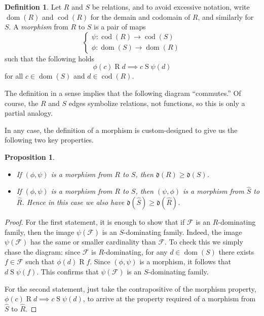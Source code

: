 \documentclass[11pt,oneside]{amsbook}
\DeclareMathOperator{\dom}{dom}
\DeclareMathOperator{\cod}{cod}
\theoremstyle{definition}
\theoremstyle{plain}
\newtheorem{prop}[thm]{Proposition}
\theoremstyle{definition}
\newtheorem{defn}[thm]{Definition}
\theoremstyle{remark}
\begin{document}
\begin{defn}
  Let $R$ and $S$ be relations, and to avoid excessive notation, write $\dom(R)$ and $\cod(R)$ for the demain and codomain of $R$, and similarly for $S$. A \emph{morphism} from $R$ to $S$ is a pair of maps
\[\begin{cases}\psi\colon\cod(R)\to\cod(S)\\\phi\colon\dom(S)\to\dom(R)\end{cases}
\]
such that the following holds
\[\phi(c)\mathrel{R}d\implies c\mathrel{S}\psi(d)
\]
for all $c\in\dom(S)$ and $d\in\cod(R)$.
\end{defn}

The definition in a sense implies that the following diagram ``commutes.'' Of course, the $R$ and $S$ edges symbolize relations, not functions, so this is only a partial analogy.
\begin{center}
\end{center}
In any case, the definition of a morphism is custom-designed to give us the following two key properties.

\begin{prop}
  \label{prop:morphism}
  \begin{itemize}
  \item If $(\phi,\psi)$ is a morphism from $R$ to $S$, then $\mathfrak d(R)\geq\mathfrak d(S)$.
  \item If $(\phi,\psi)$ is a morphism from $R$ to $S$, then $(\psi,\phi)$ is a morphism from $\hat S$ to $\hat R$. Hence in this case we also have $\mathfrak d(\hat S)\geq\mathfrak d(\hat R)$.
  \end{itemize}
\end{prop}

\begin{proof}
  For the first statement, it is enough to show that if $\mathcal F$ is an $R$-dominating family, then the image $\psi(\mathcal F)$ is an $S$-dominating family. Indeed, the image $\psi(\mathcal F)$ has the same or smaller cardinality than $\mathcal F$. To check this we simply chase the diagram: since $\mathcal F$ is $R$-dominating, for any $d\in\dom(S)$ there exists $f\in\mathcal F$ such that $\phi(d)\mathrel{R}f$. Since $(\phi,\psi)$ is a morphism, it follows that $d\mathrel{S}\psi(f)$. This confirms that $\psi(\mathcal F)$ is an $S$-dominating family.

  For the second statement, just take the contrapositive of the morphism property, $\phi(c)\mathrel R d\implies c\mathrel S\psi(d)$, to arrive at the property required of a morphism from $\hat S$ to $\hat R$.
\end{proof}
\end{document}
